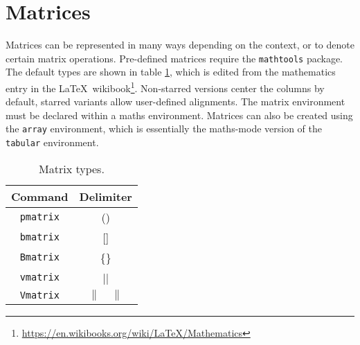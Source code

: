 \section{Matrices}
%
Matrices can be represented in many ways depending on the context, or to denote certain matrix operations. Pre-defined matrices require the \verb|mathtools| package. The default types are shown in table \ref{t:mat}, which is edited from the mathematics entry in the \LaTeX~wikibook\footnote{\url{https://en.wikibooks.org/wiki/LaTeX/Mathematics}}. Non-starred versions center the columns by default, starred variants allow user-defined alignments. The matrix environment must be declared within a maths environment. Matrices can also be created using the \verb|array| environment, which is essentially the maths-mode version of the \verb|tabular| environment.
\begin{table}[!htbp]
    \centering
    \caption{Matrix types.}
    \label{t:mat}
    \begin{tabular}{cc}
        \toprule
        Command & Delimiter \\
        \midrule
        \verb|pmatrix| & (\quad) \\
        \verb|bmatrix| & [\quad] \\
        \verb|Bmatrix| & \{\quad\} \\
        \verb|vmatrix| & |\quad| \\
        \verb|Vmatrix| & $\|\quad\|$ \\
        \bottomrule
    \end{tabular}
\end{table}
%
